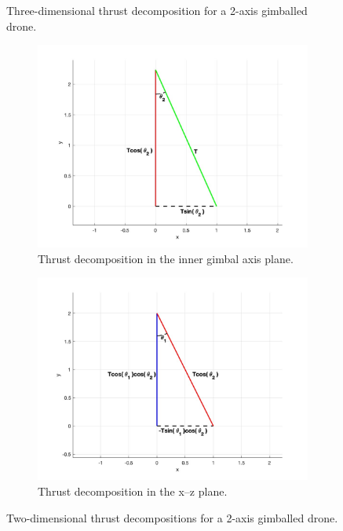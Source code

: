 \documentclass[]{article}
\begin{document}
\begin{enumerate}
\begin{figure}[H]
	\caption{Three-dimensional thrust decomposition for a 2-axis gimballed drone.}
	\label{fig:3dgraph}
	\end{figure}
        \begin{figure}[H]
        	\centering
        	\begin{subfigure}[b]{0.48\textwidth}
        		\centering
        		\includegraphics[width=\textwidth]{graph2.jpg}
        		\caption{Thrust decomposition in the inner gimbal axis plane.}
        	\end{subfigure}
        	\begin{subfigure}[b]{0.48\textwidth}
        		\centering
        		\includegraphics[width=\textwidth]{graph3.jpg}
        		\caption{Thrust decomposition in the x–z plane.}
        	\end{subfigure}
        	\caption{Two-dimensional thrust decompositions for a 2-axis gimballed drone.}
        	\label{fig:3dDecomp}
        \end{figure}


\end{enumerate}
\end{document}
